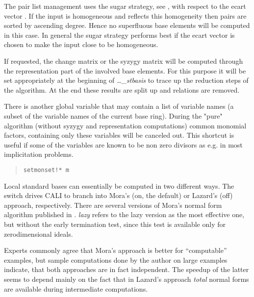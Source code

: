 The pair list management uses the sugar strategy, see \cite{GMNRT},
with respect to the ecart vector . If the input is
homogeneous and  reflects this homogeneity then
pairs are sorted by ascending degree. Hence no superfluous base
elements will be computed in this case. In general the sugar strategy
performs best if the ecart vector is chosen to make the input close
to be homogeneous.

If requested, the change matrix or the syzygy matrix will be computed
through the representation part of the involved base elements. For
this purpose it will be set appropriately at the beginning of {\em
\ldots\_stbasis} to trace up the reduction steps of the algorithm. At
the end these results are split up and relations are removed.

There is another global variable  that may contain
a list of variable names (a subset of the variable names of the
current base ring). During the "pure" \gr algorithm (without syzygy
and representation computations) common monomial factors, containing
only these variables will be canceled out. This shortcut is useful if
some of the variables are known to be non zero divisors as e.g. in
most implicitation problems.
\begin{quote}
\verb|setmonset!* m|

\end{quote}

Local standard bases can essentially be computed in two different
ways. The switch  drives CALI to branch into Mora's (on,
the default) or Lazard's (off) approach, respectively. There are
several versions of Mora's normal form algorithm published in
\cite{MPT}.  {\em lazy} refers to the lazy version as the most
effective one, but without the early termination test, since this
test is available only for zerodimensional ideals.

Experts commonly agree that Mora's approach is better for
``computable'' examples, but sample computations done by the author
on large examples indicate, that both approaches are in fact
independent. The speedup of the latter seems to depend mainly on the
fact that in Lazard's approach {\em total} normal forms are available
during intermediate computations.
\medskip

